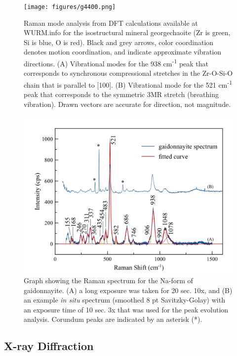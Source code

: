 \documentclass[journal=acsodf,manuscript=article]{achemso}
\begin{document}
\begin{figure}[h!]  %
\begin{center}
\texttt{[image: figures/g4400.png]}
\caption{{Raman mode analysis from DFT calculations available at WURM.info for the isostructural mineral georgechaoite (Zr is green, Si is blue, O is red).
Black and grey arrows, color coordination denotes motion coordination,
and indicate approximate vibration directions. (A) Vibrational modes for
the 938 cm\textsuperscript{-1} peak that corresponds to
synchronous compressional stretches in the Zr-O-Si-O chain that is
parallel to {[}100{]}.  (B) Vibrational mode for the 521
cm\textsuperscript{-1} peak that corresponds to the symmetric 3MR
stretch (breathing vibration).  Drawn vectors are accurate for
direction, not magnitude.
{\label{Raman_DFT_vib}}%
}}
\end{center}
\end{figure}


\begin{figure}[h!]  %
\begin{center}
\includegraphics[width=0.70\columnwidth]{figures/Gaid_Good_and_In_Situ_fitted.png} 
\caption{{Graph showing the Raman spectrum for the Na-form of gaidonnayite.  (A) a
long exposure was taken for 20 sec. 10x, and (B) an example \emph{in
situ} spectrum (smoothed 8 pt Savitzky-Golay) with an exposure time of
10 sec. 3x that was used for the peak evolution analysis.  Corundum
peaks are indicated by an asterisk (*).
{\label{fitted_raman_peaks}}%
}}
\end{center}
\end{figure}



\subsection{X-ray Diffraction}
\end{document}
